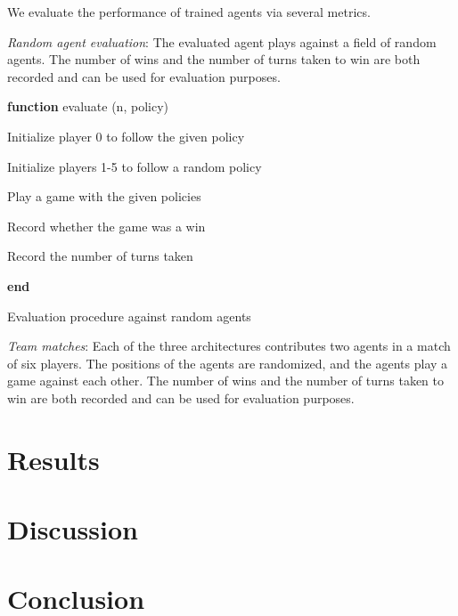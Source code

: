 \documentclass[12pt, a4paper, twocolumn]{article}
\begin{document}
We evaluate the performance of trained agents via several metrics.

\textit{Random agent evaluation}: The evaluated agent plays against a field of random agents. The number of wins and the number of turns taken to win are both recorded and can be used for evaluation purposes.

\begin{algorithm}

  \textbf{function} evaluate (n, policy)

  \Indp
  
  
  Initialize player 0 to follow the given policy
  
  Initialize players 1-5 to follow a random policy

   {
    Play a game with the given policies

    Record whether the game was a win

    Record the number of turns taken
  }


  \Indm
  \textbf{end}
  \caption{Evaluation procedure against random agents}

\end{algorithm}

\textit{Team matches}: Each of the three architectures contributes two agents in a match of six players. The positions of the agents are randomized, and the agents play a game against each other. The number of wins and the number of turns taken to win are both recorded and can be used for evaluation purposes.




\section{Results}

\lipsum[1]

\section{Discussion}

\lipsum[1]

\section{Conclusion}

\lipsum[1]


\nocite{*}


\end{document}
